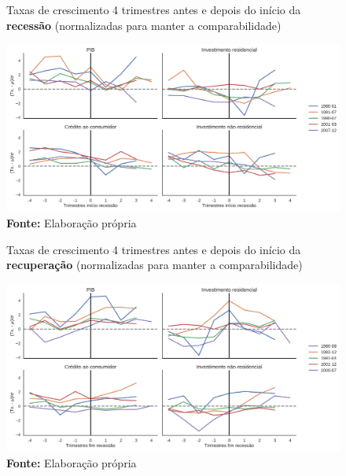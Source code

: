 \begin{figure}[H]
	\centering
	\caption{Taxas de crescimento 4 trimestres antes e depois do início da  \textbf{recessão} (normalizadas para manter a comparabilidade)}
	\label{FigCriseNorm}
	\includegraphics[width=\textwidth]{../../Dados/Fatos_Estilizados/figs/Centrado_Inicio_Norm.png}
	\caption*{\textbf{Fonte:} Elaboração própria}
\end{figure}

\begin{figure}[H]
	\centering
	\caption{Taxas de crescimento 4 trimestres antes e depois do início da  \textbf{recuperação} (normalizadas para manter a comparabilidade)}
	\label{FigRecuperacaoNorm}
	\includegraphics[width=\textwidth]{../../Dados/Fatos_Estilizados/figs/Centrado_Fim_Norm.png}
	\caption*{\textbf{Fonte:} Elaboração própria}
\end{figure}



